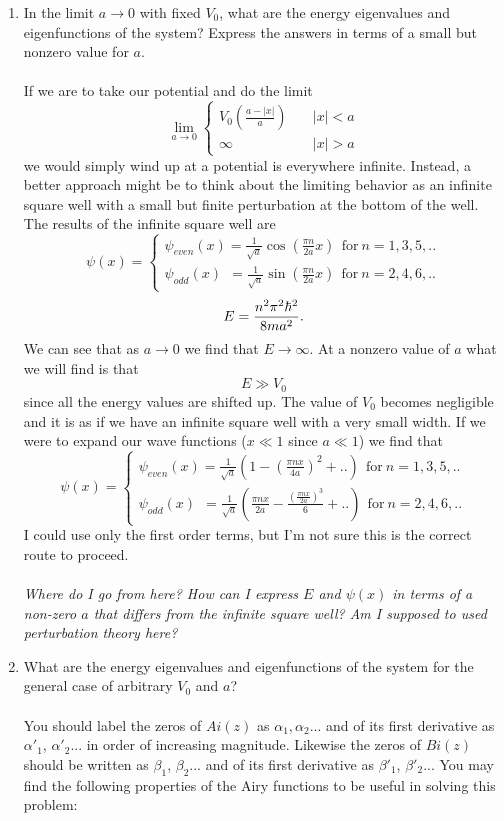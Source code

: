 \documentclass[11pt,letterpaper]{article}
\begin{document}
\begin{enumerate}
\begin{enumerate}
\item In the limit $a\to0$ with fixed $V_0$, what are the energy eigenvalues and eigenfunctions of the system? Express the answers in terms of a small but nonzero value for $a$. 
\\ \\If we are to take our potential and do the limit
$$\lim_{a\to0}{\begin{cases}V_0\left(\frac{a-|x|}{a}\right)&\quad |x|<a\\\infty&\quad|x|>a\end{cases}}$$
we would simply wind up at a potential is everywhere infinite. Instead, a better approach might be to think about the limiting behavior as an infinite square well with a small but finite perturbation at the bottom of the well. The results of the infinite square well are 
$$\psi(x) = \begin{cases} \psi_{even}(x)=\frac{1}{\sqrt a}\cos\left(\frac{\pi n}{2a}x\right)\ \ \text{for}\ n = 1,3,5,..\\
\psi_{odd}(x)\;\,= \frac{1}{\sqrt a}\sin\left(\frac{\pi n}{2a}x\right)\ \ \text{for}\ n = 2,4,6,..\end{cases}$$
$$E = \frac{n^2\pi^2\hbar^2}{8ma^2}.$$ We can see that as $a\to 0$ we find that $E\to\infty$. At a nonzero value of $a$ what we will find is that 
$$E\gg V_0$$
since all the energy values are shifted up. The value of $V_0$ becomes negligible and it is as if we have an infinite square well with a very small width. If we were to expand our wave functions ($x\ll 1$ since $a\ll 1$) we find that 
$$\psi(x) = \begin{cases} \psi_{even}(x)=\frac{1}{\sqrt a}\left(1-(\frac{\pi nx}{4a})^2+..\right)\ \ \text{for}\ n = 1,3,5,..\\
\psi_{odd}(x)\;\,= \frac{1}{\sqrt a}\left(\frac{\pi nx}{2a}-\frac{\left(\frac{\pi nx}{2a}\right)^3}{6}+..\right)\ \ \text{for}\ n = 2,4,6,..\end{cases}$$
I could use only the first order terms, but I'm not sure this is the correct route to proceed. 
\\ \\\emph{Where do I go from here? How can I express $E$ and $\psi(x)$ in terms of a non-zero $a$ that differs from the infinite square well? Am I supposed to used perturbation theory here?}\\
\item What are the energy eigenvalues and eigenfunctions of the system for the general case of arbitrary $V_0$ and $a$?
 \\ \\You should label the zeros of $Ai(z)$ as $\alpha_1,\alpha_2$... and of its first derivative as $\alpha'_1$, $\alpha'_2$... in order of increasing magnitude. Likewise the zeros of $Bi(z)$ should be written as $\beta_1$, $\beta_2$... and of its first derivative as $\beta'_1$, $\beta'_2$... You may find the following properties of the Airy functions to be useful in solving this problem:

\end{enumerate}
\end{enumerate}
\end{document}
